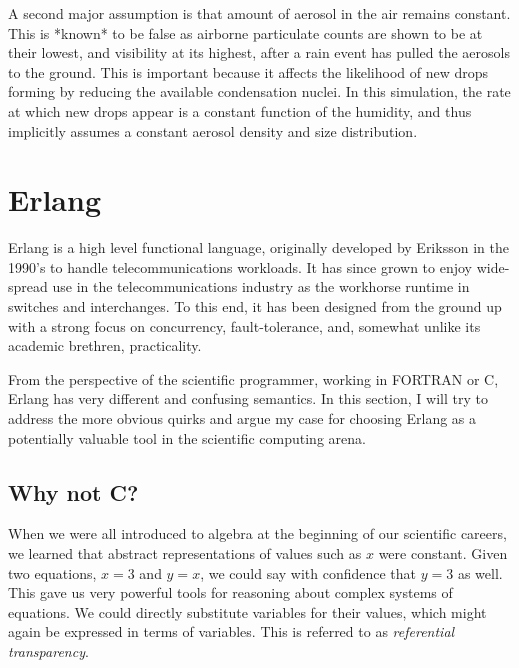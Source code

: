 \documentclass[twocolumn,a4paper,10pt]{article}
\begin{document}
A second major assumption is that amount of aerosol in the air remains constant.
This is *known* to be false as airborne particulate counts are shown to be at
their lowest, and visibility at its highest, after a rain event has pulled the
aerosols to the ground. This is important because it affects the likelihood of
new drops forming by reducing the available condensation nuclei. In this
simulation, the rate at which new drops appear is a constant function of the
humidity, and thus implicitly assumes a constant aerosol density and size
distribution.

\section{Erlang}

Erlang is a high level functional language, originally developed by Eriksson in
the 1990's to handle telecommunications workloads. It has since grown to enjoy
wide-spread use in the telecommunications industry as the workhorse runtime in
switches and interchanges. To this end, it has been designed from the ground up
with a strong focus on concurrency, fault-tolerance, and, somewhat unlike its
academic brethren, practicality.

From the perspective of the scientific programmer, working in FORTRAN or C,
Erlang has very different and confusing semantics. In this section, I will try
to address the more obvious quirks and argue my case for choosing Erlang as a
potentially valuable tool in the scientific computing arena.

\subsection{Why not C?}

When we were all introduced to algebra at the beginning of our scientific
careers, we learned that abstract representations of values such as $x$ were
constant. Given two equations, $x = 3$ and $y = x$, we could say with confidence
that $y = 3$ as well. This gave us very powerful tools for reasoning about
complex systems of equations. We could directly substitute variables for their
values, which might again be expressed in terms of variables. This is referred
to as \emph{referential transparency}.
\end{document}
